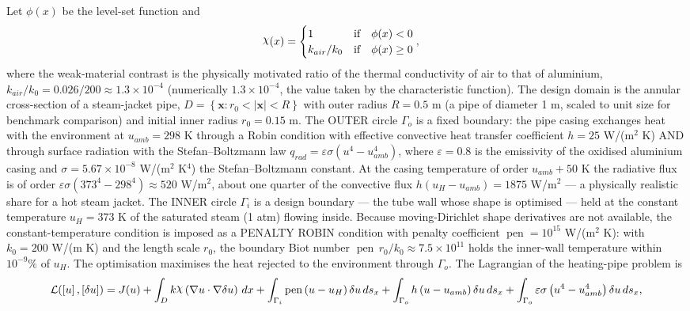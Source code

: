 \documentclass[preview]{standalone}
\let\oldcdot\cdot
\let\cdot\oldcdot
\begin{document}
Let $\phi(x)$ be the level-set function and
 \begin{align*}\raisebox{\depth}{$\chi$}(x) &= \begin{cases} 1 & \mbox{if}\quad \phi(x) < 0 \\ k_{air}/k_0 & \mbox{if}\quad \phi(x)  \ge 0 \end{cases},\end{align*}
where the weak-material contrast is the physically motivated ratio of the thermal conductivity of air to that of aluminium, $k_{air}/k_0 = 0.026/200 \approx 1.3 \times 10^{-4}$ (numerically $1.3 \times 10^{-4}$, the value taken by the characteristic function).
The design domain is the annular cross-section of a steam-jacket pipe, $D = \left\{ \mathbf x : r_0 < \left|\mathbf x\right| < R \right\}$ with outer radius $R = 0.5$ m (a pipe of diameter 1 m, scaled to unit size for benchmark comparison) and initial inner radius $r_0 = 0.15$ m.  The OUTER circle $\Gamma_o$ is a fixed boundary: the pipe casing exchanges heat with the environment at $u_{amb} = 298$ K through a Robin condition with effective convective heat transfer coefficient $h = 25$ W/(m$^{2}$ K) AND through surface radiation with the Stefan--Boltzmann law $q_{rad} = \varepsilon \sigma \left( u^{4} - u_{amb}^{4}\right)$, where $\varepsilon = 0.8$ is the emissivity of the oxidised aluminium casing and $\sigma = 5.67 \times 10^{-8}$ W/(m$^{2}$ K$^{4}$) the Stefan--Boltzmann constant.  At the casing temperature of order $u_{amb} + 50$ K the radiative flux is of order $\varepsilon \sigma \left(373^{4} - 298^{4}\right) \approx 520$ W/m$^{2}$, about one quarter of the convective flux $h\left(u_H - u_{amb}\right) = 1875$ W/m$^{2}$ — a physically realistic share for a hot steam jacket.  The INNER circle $\Gamma_i$ is a design boundary — the tube wall whose shape is optimised — held at the constant temperature $u_H = 373$ K of the saturated steam (1 atm) flowing inside.  Because moving-Dirichlet shape derivatives are not available, the constant-temperature condition is imposed as a PENALTY ROBIN condition with penalty coefficient $\operatorname{pen} = 10^{15}$ W/(m$^{2}$ K): with $k_0 = 200$ W/(m K) and the length scale $r_0$, the boundary Biot number $\operatorname{pen}\, r_0 / k_0 \approx 7.5 \times 10^{11}$ holds the inner-wall temperature within $10^{-9}\%$ of $u_H$.  The optimisation maximises the heat rejected to the environment through $\Gamma_o$.
The Lagrangian of the heating-pipe problem is
\begin{dmath*}
\mathcal L(\left[ u\right],\left[ \delta u\right]) = J(u) +  \int_{D} k \raisebox{\depth}{$\chi$} \left(  \nabla u  \cdot  \nabla \delta u  \right) \,dx + \int_{\Gamma_i} \operatorname{pen} \left( u - u_{H}\right) \delta u \,ds_x + \int_{\Gamma_o} h \left( u - u_{amb}\right) \delta u \,ds_x + \int_{\Gamma_o} \varepsilon \sigma \left( u^{4} - u_{amb}^{4}\right) \delta u \,ds_x ,
\end{dmath*}
\end{document}

